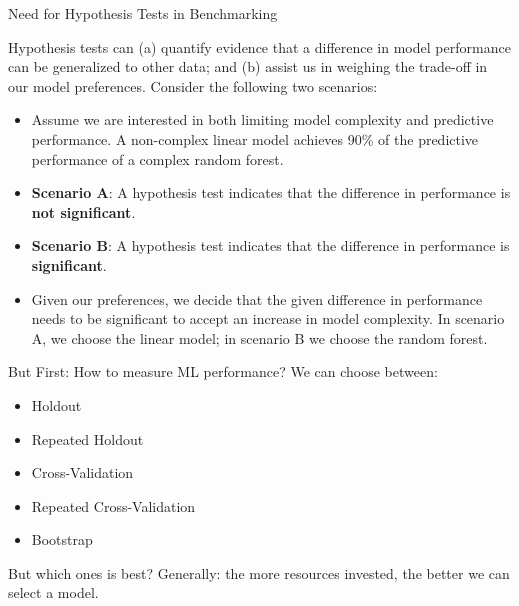\documentclass[11pt,compress,t,notes=noshow, aspectratio=169, xcolor=table]{beamer}
\begin{document}
\begin{frame}{Need for Hypothesis Tests in Benchmarking}

Hypothesis tests can (a) quantify evidence that a difference in model performance can be generalized to other data; and (b) assist us in weighing the trade-off in our model preferences. Consider the following two scenarios:
\vspace{0.25cm}
\begin{itemize}
    \setlength\itemsep{1em} 
    \item Assume we are interested in both limiting model complexity and predictive performance. A non-complex linear model achieves 90\% of the predictive performance of a complex random forest.
    \item \textbf{Scenario A}: A hypothesis test indicates that the difference in performance is \textbf{not significant}.
    \item \textbf{Scenario B}: A hypothesis test indicates that the difference in performance is \textbf{significant}.
    \item Given our preferences, we decide that the given difference in performance needs to be significant to accept an increase in model complexity. In scenario A, we choose the linear model; in scenario B we choose the random forest.
\end{itemize}

\end{frame}

\begin{frame}{But First: How to measure ML performance?}
\vfill
We can choose between:
\vfill
\begin{itemize}
    \item Holdout
    \item Repeated Holdout
    \item Cross-Validation
    \item Repeated Cross-Validation
    \item Bootstrap
\end{itemize}
\vfill
But which ones is best?
\pause
\newline{}
Generally: the more resources invested, the better we can select a model.
\end{frame}
\end{document}
